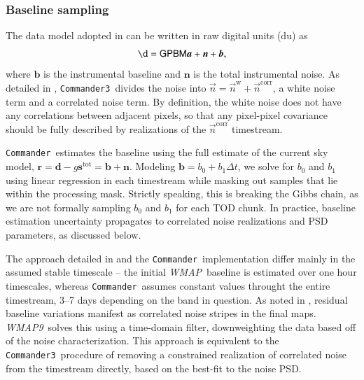 \documentclass[twocolumn]{../../common/aa}
\def\WMAP{\emph{WMAP}}
\def\WMAPnine{\emph{WMAP9}}
\def\commander{\texttt{Commander}}
\def\commanderthree{\texttt{Commander3}}
\newcommand{\n}[0]{\vec{n}}
\begin{document}
\subsubsection{Baseline sampling}
\label{ssec:baseline}

The data model adopted in \citet{hinshaw2003a} can be written in raw digital units (du) as
\begin{equation}
	\d = \mathsf{GPBM}\boldsymbol a+\boldsymbol n+\boldsymbol b,
\end{equation}
where $\boldsymbol b$ is the instrumental baseline and $\boldsymbol n$ is the
total instrumental noise. As detailed in \citet{bp06}, \commanderthree\ divides
the noise into $\n=\n^\mathrm w+\n^\mathrm{corr}$, a white noise term and a
correlated noise term. By definition, the white noise does not have any
correlations between adjacent pixels, so that any pixel-pixel covariance should
be fully described by realizations of the $\n^\mathrm{corr}$ timestream.

\commander\ estimates the baseline using the full estimate of the current sky
model, $\boldsymbol r=\boldsymbol d-g\boldsymbol s^\mathrm{tot}=\boldsymbol
b+\boldsymbol n$. Modeling $\boldsymbol b=b_0+b_1\Delta t$, we solve for $b_0$
and $b_1$ using linear regression in each timestream while masking out samples
that lie within the processing mask. Strictly speaking, this is breaking the
Gibbs chain, as we are not formally sampling $b_0$ and $b_1$ for each TOD
chunk. In practice, baseline estimation uncertainty propagates to correlated
noise realizations and PSD parameters, as discussed below.

The approach detailed in \citet{hinshaw2003a} and the \commander\
implementation differ mainly in the assumed stable timescale -- the initial
\WMAP\ baseline is estimated over one hour timescales, whereas \commander\
assumes constant values throught the entire timestream, 3--7 days depending on
the band in question. As noted in \citet{hinshaw2003a}, residual baseline
variations manifest as correlated noise stripes in the final maps. \WMAPnine\
solves this using a time-domain filter, downweighting the data based off of the
noise characterization. This approach is equivalent to the \commanderthree\
procedure of removing a constrained realization of correlated noise from the
timestream directly, based on the best-fit to the noise PSD.

\end{document}
